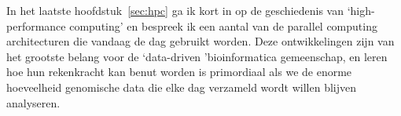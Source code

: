 In het laatste hoofdstuk~\ref{sec:hpc} ga ik kort in op de geschiedenis van `high-performance computing' en bespreek ik een aantal van de parallel computing architecturen die vandaag de dag gebruikt worden.
Deze ontwikkelingen zijn van het grootste belang voor de `data-driven 'bioinformatica gemeenschap, en leren hoe hun rekenkracht kan benut worden is primordiaal als we de enorme hoeveelheid genomische data die elke dag verzameld wordt willen blijven analyseren.

